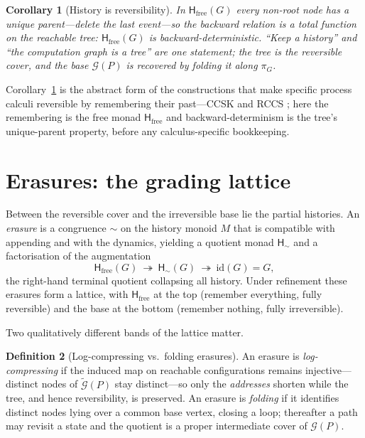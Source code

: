 \documentclass[11pt]{article}
\theoremstyle{definition}
\newtheorem{definition}{Definition}[section]
\theoremstyle{plain}
\newtheorem{corollary}[definition]{Corollary}
\theoremstyle{remark}
\newcommand{\hist}{\mathsf{H}}
\newcommand{\Grph}{\mathcal{G}}
\newcommand{\cover}{\widetilde{\mathcal{G}}}
\newcommand{\id}{\mathrm{id}}
\begin{document}
\begin{corollary}[History is reversibility]\label{cor:rev}
In $\hist_{\mathrm{free}}(G)$ every non-root node has a unique parent---delete the last event---so
the backward relation is a total function on the reachable tree: $\hist_{\mathrm{free}}(G)$ is
backward-deterministic. ``Keep a history'' and ``the computation graph is a tree'' are one
statement; the tree is the reversible cover, and the base $\Grph(P)$ is recovered by folding it
along $\pi_G$.
\end{corollary}

Corollary~\ref{cor:rev} is the abstract form of the constructions that make specific process
calculi reversible by remembering their past---CCSK \cite{CCSK} and RCCS \cite{RCCS}; here the
remembering is the free monad $\hist_{\mathrm{free}}$ and backward-determinism is the tree's
unique-parent property, before any calculus-specific bookkeeping.

\section{Erasures: the grading lattice}
\label{sec:erasure}

Between the reversible cover and the irreversible base lie the partial histories. An \emph{erasure}
is a congruence $\sim$ on the history monoid $M$ that is compatible with appending and with the
dynamics, yielding a quotient monad $\hist_{\sim}$ and a factorisation of the augmentation
\[
  \hist_{\mathrm{free}}(G)\ \twoheadrightarrow\ \hist_{\sim}(G)\ \twoheadrightarrow\ \id(G)=G,
\]
the right-hand terminal quotient collapsing all history. Under refinement these erasures form a
lattice, with $\hist_{\mathrm{free}}$ at the top (remember everything, fully reversible) and the
base at the bottom (remember nothing, fully irreversible).

Two qualitatively different bands of the lattice matter.

\begin{definition}[Log-compressing vs.\ folding erasures]\label{def:bands}
An erasure is \emph{log-compressing} if the induced map on reachable configurations remains
injective---distinct nodes of $\cover(P)$ stay distinct---so only the \emph{addresses} shorten while
the tree, and hence reversibility, is preserved. An erasure is \emph{folding} if it identifies
distinct nodes lying over a common base vertex, closing a loop; thereafter a path may revisit a
state and the quotient is a proper intermediate cover of $\Grph(P)$.
\end{definition}
\end{document}
